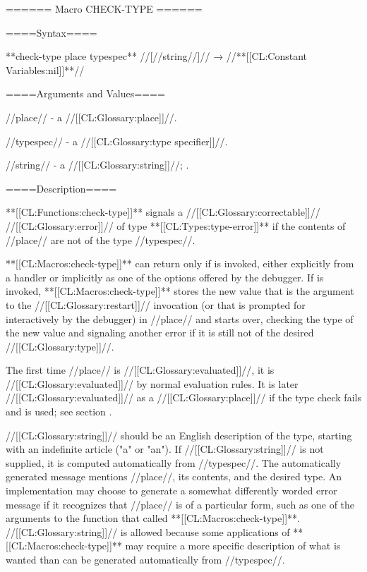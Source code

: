 ====== Macro CHECK-TYPE ======

====Syntax====

**check-type {place typespec** //[//string//]}// → //**[[CL:Constant Variables:nil]]**//

====Arguments and Values====

//place// - a //[[CL:Glossary:place]]//.

//typespec// - a //[[CL:Glossary:type specifier]]//.

//string// - a //[[CL:Glossary:string]]//; \eval.

====Description====

**[[CL:Functions:check-type]]** signals a //[[CL:Glossary:correctable]]// //[[CL:Glossary:error]]// of type **[[CL:Types:type-error]]** if the contents of //place// are not of the type //typespec//.

**[[CL:Macros:check-type]]** can return only if  is invoked, either explicitly from a handler or implicitly as one of the options offered by the debugger. If  is invoked, **[[CL:Macros:check-type]]** stores the new value that is the argument to the //[[CL:Glossary:restart]]// invocation (or that is prompted for interactively by the debugger) in //place// and starts over, checking the type of the new value and signaling another error if it is still not of the desired //[[CL:Glossary:type]]//.

The first time //place// is //[[CL:Glossary:evaluated]]//, it is //[[CL:Glossary:evaluated]]// by normal evaluation rules. It is later //[[CL:Glossary:evaluated]]// as a //[[CL:Glossary:place]]// if the type check fails and  is used; see section {\secref\GenRefSubFormEval}.

//[[CL:Glossary:string]]// should be an English description of the type, starting with an indefinite article ("a" or "an"). If //[[CL:Glossary:string]]// is not supplied, it is computed automatically from //typespec//. The automatically generated message mentions //place//, its contents, and the desired type. An implementation may choose to generate a somewhat differently worded error message if it recognizes that //place// is of a particular form, such as one of the arguments to the function that called **[[CL:Macros:check-type]]**. //[[CL:Glossary:string]]// is allowed because some applications of **[[CL:Macros:check-type]]** may require a more specific description of what is wanted than can be generated automatically from //typespec//.

